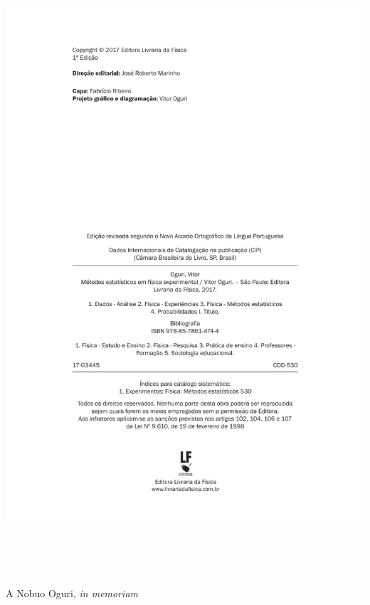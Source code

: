 \newpage
\thispagestyle{empty}

\vspace*{-3cm}

\centerline{\includegraphics[height=23cm]{ficha_catalografica}}

\newpage


\begin{flushright}
\begin{minipage}{3.cm}
\baselineskip=8pt
\hfill A Nobuo Oguri, \textit{in memoriam}

\end{minipage}
\end{flushright}

